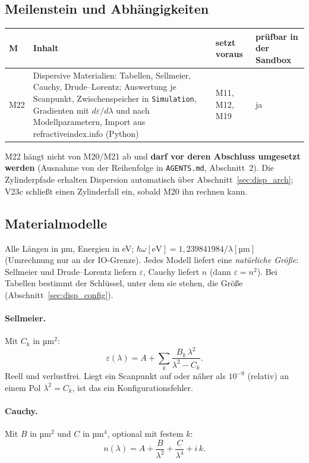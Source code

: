 \subsection{Meilenstein und Abhängigkeiten}
\begin{center}
\small
\begin{tabular}{p{1.0cm}p{6.6cm}p{3.0cm}p{3.8cm}}
\toprule
M & Inhalt & setzt voraus & prüfbar in der Sandbox \\
\midrule
M22 & Dispersive Materialien: Tabellen, Sellmeier, Cauchy, Drude--Lorentz; Auswertung je Scanpunkt, Zwischenspeicher in
      \verb|Simulation|, Gradienten mit $d\varepsilon/d\lambda$ und nach Modellparametern, Import aus
      refractiveindex.info (Python) & M11, M12, M19 & ja \\
\bottomrule
\end{tabular}
\end{center}
M22 hängt nicht von M20/M21 ab und \textbf{darf vor deren Abschluss umgesetzt werden} (Ausnahme von der Reihenfolge in
\verb|AGENTS.md|, Abschnitt~2). Die Zylinderpfade erhalten Dispersion automatisch über Abschnitt~\ref{sec:disp_arch};
V23c schließt einen Zylinderfall ein, sobald M20 ihn rechnen kann.

\subsection{Materialmodelle}\label{sec:disp_models}
Alle Längen in µm, Energien in eV; $\hbar\omega[\mathrm{eV}]=1{,}239841984/\lambda[\text{µm}]$ (Umrechnung nur an der
IO-Grenze). Jedes Modell liefert eine \emph{natürliche Größe}: Sellmeier und Drude--Lorentz liefern $\varepsilon$,
Cauchy liefert $n$ (dann $\varepsilon=n^2$). Bei Tabellen bestimmt der Schlüssel, unter dem sie stehen, die Größe
(Abschnitt~\ref{sec:disp_config}).

\paragraph{Sellmeier.} Mit $C_k$ in µm$^2$:
\begin{equation}\label{eq:disp_sellmeier}
  \varepsilon(\lambda)=A+\sum_{k}\frac{B_k\,\lambda^2}{\lambda^2-C_k}.
\end{equation}
Reell und verlustfrei. Liegt ein Scanpunkt auf oder näher als $10^{-9}$ (relativ) an einem Pol
$\lambda^2=C_k$, ist das ein Konfigurationsfehler.

\paragraph{Cauchy.} Mit $B$ in µm$^2$ und $C$ in µm$^4$, optional mit festem $k$:
\begin{equation}\label{eq:disp_cauchy}
  n(\lambda)=A+\frac{B}{\lambda^2}+\frac{C}{\lambda^4}+i\,k .
\end{equation}

